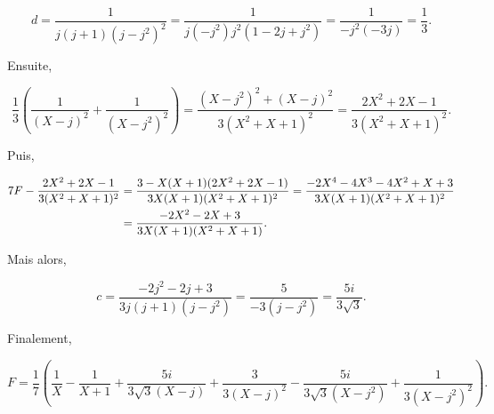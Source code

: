 {{$$d=\frac{1}{j(j+1)(j-j^2)^2}=\frac{1}{j(-j^2)j^2(1-2j+j^2)}=\frac{1}{-j^2(-3j)}=\frac{1}{3}.$$

Ensuite, 

$$\frac{1}{3}(\frac{1}{(X-j)^2}+\frac{1}{(X-j^2)^2})=\frac{(X-j^2)^2+(X-j)^2}{3(X^2+X+1)^2}
=\frac{2X^2+2X-1}{3(X^2+X+1)^2}.$$

Puis,

\begin{align*}\ensuremath
7F-\frac{2X^2+2X-1}{3(X^2+X+1)^2}&=\frac{3-X(X+1)(2X^2+2X-1)}{3X(X+1)(X^2+X+1)^2}
=\frac{-2X^4-4X^3-4X^2+X+3}{3X(X+1)(X^2+X+1)^2}\\
 &=\frac{-2X^2-2X+3}{3X(X+1)(X^2+X+1)}.
\end{align*}

Mais alors, 

$$c=\frac{-2j^2-2j+3}{3j(j+1)(j-j^2)}=\frac{5}{-3(j-j^2)}=\frac{5i}{3\sqrt{3}}.$$

Finalement,

$$F=\frac{1}{7}(\frac{1}{X}-\frac{1}{X+1}+\frac{5i}{3\sqrt{3}(X-j)}+\frac{3}{3(X-j)^2}-\frac{5i}{3\sqrt{3}(X-j^2)}+\frac{1}{3(X-j^2)^2}).$$
}
}
